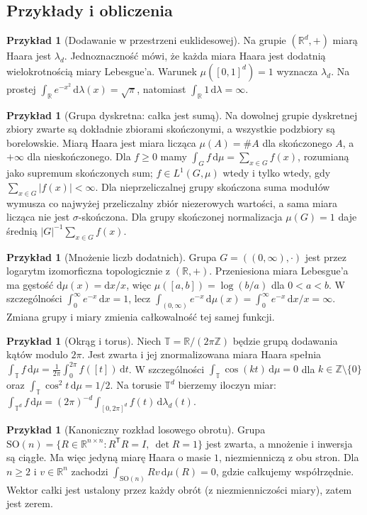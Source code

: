 \documentclass[11pt,a4paper]{article}
\numberwithin{equation}{section}
\theoremstyle{plain}
\theoremstyle{definition}
\newtheorem{przyklad}[twierdzenie]{Przykład}
\theoremstyle{remark}
\newcommand{\R}{\mathbb R}
\begin{document}
\subsection*{Przykłady i obliczenia}
\begin{przyklad}[Dodawanie w przestrzeni euklidesowej]
Na grupie $(\R^d,+)$ miarą Haara jest $\lambda_d$. Jednoznaczność mówi, że każda miara Haara jest dodatnią wielokrotnością miary Lebesgue'a. Warunek $\mu([0,1]^d)=1$ wyznacza $\lambda_d$. Na prostej $\int_\R e^{-x^2}\,\mathrm d\lambda(x)=\sqrt\pi$, natomiast $\int_\R1\,\mathrm d\lambda=\infty$.
\end{przyklad}
\begin{przyklad}[Grupa dyskretna: całka jest sumą]
Na dowolnej grupie dyskretnej zbiory zwarte są dokładnie zbiorami skończonymi, a wszystkie podzbiory są borelowskie. Miarą Haara jest miara licząca $\mu(A)=\#A$ dla skończonego $A$, a $+\infty$ dla nieskończonego. Dla $f\ge0$ mamy $\int_Gf\,\mathrm d\mu=\sum_{x\in G}f(x)$, rozumianą jako supremum skończonych sum; $f\in L^1(G,\mu)$ wtedy i tylko wtedy, gdy $\sum_{x\in G}|f(x)|<\infty$. Dla nieprzeliczalnej grupy skończona suma modułów wymusza co najwyżej przeliczalny zbiór niezerowych wartości, a sama miara licząca nie jest $\sigma$-skończona. Dla grupy skończonej normalizacja $\mu(G)=1$ daje średnią $|G|^{-1}\sum_{x\in G}f(x)$.
\end{przyklad}
\begin{przyklad}[Mnożenie liczb dodatnich]
Grupa $G=((0,\infty),\cdot)$ jest przez logarytm izomorficzna topologicznie z $(\R,+)$. Przeniesiona miara Lebesgue'a ma gęstość $\mathrm d\mu(x)=\mathrm dx/x$, więc $\mu([a,b])=\log(b/a)$ dla $0<a<b$. W szczególności $\int_0^\infty e^{-x}\,\mathrm dx=1$, lecz $\int_{(0,\infty)}e^{-x}\,\mathrm d\mu(x)=\int_0^\infty e^{-x}\,\mathrm dx/x=\infty$. Zmiana grupy i miary zmienia całkowalność tej samej funkcji.
\end{przyklad}
\begin{przyklad}[Okrąg i torus]
Niech $\mathbb T=\R/(2\pi\mathbb Z)$ będzie grupą dodawania kątów modulo $2\pi$. Jest zwarta i jej znormalizowana miara Haara spełnia
$\int_{\mathbb T}f\,\mathrm d\mu=\frac1{2\pi}\int_0^{2\pi}f([t])\,\mathrm dt$. W szczególności $\int_{\mathbb T}\cos(kt)\,\mathrm d\mu=0$ dla $k\in\mathbb Z\setminus\{0\}$ oraz $\int_{\mathbb T}\cos^2t\,\mathrm d\mu=1/2$. Na torusie $\mathbb T^d$ bierzemy iloczyn miar: $\int_{\mathbb T^d}f\,\mathrm d\mu=(2\pi)^{-d}\int_{[0,2\pi]^d}f(t)\,\mathrm d\lambda_d(t)$.
\end{przyklad}
\begin{przyklad}[Kanoniczny rozkład losowego obrotu]
Grupa $\mathrm{SO}(n)=\{R\in\R^{n\times n}:R^{\mathsf T}R=I,\ \det R=1\}$ jest zwarta, a mnożenie i inwersja są ciągłe. Ma więc jedyną miarę Haara o masie $1$, niezmienniczą z obu stron. Dla $n\ge2$ i $v\in\R^n$ zachodzi $\int_{\mathrm{SO}(n)}Rv\,\mathrm d\mu(R)=0$, gdzie całkujemy współrzędnie. Wektor całki jest ustalony przez każdy obrót (z niezmienniczości miary), zatem jest zerem.
\end{przyklad}
\end{document}
